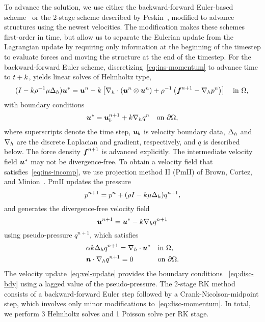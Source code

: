 To advance the solution, we use either the backward-forward Euler-based scheme~%
\cite{Ascher:1997tm} or the 2-stage scheme described by Peskin~\cite{Peskin:2002go},
modified to advance structures using the newest velocities. The modification makes these
schemes first-order in time, but allow us to separate the Eulerian update from the
Lagrangian update by requiring only information at the beginning of the timestep to
evaluate forces and moving the structure at the end of the timestep. For the
backward-forward Euler scheme, discretizing~\eqref{eq:ins-momentum} to advance time to
$t+k$, yields linear solves of Helmholtz type,
\begin{equation}\label{eq:disc-momentum}
    (I - \timestep\rho^{-1}\mu \laplacian_h) \u^\ast = \u^n - \timestep\left[\div[h]\left(\u^n\otimes\u^n\right) + \rho^{-1}\left(\f^{n+1} - \grad[h]p^n\right)\right] \quad\text{in}~\domain, \\
\end{equation}
with boundary conditions
\begin{equation}\label{eq:disc-bdy}
    \u^\ast = \u^{n+1}_b + \timestep \grad[h] q^{n} \quad\text{on}~\partial\domain,
\end{equation}
where superscripts denote the time step, $\boldsymbol{u}_b$ is velocity boundary data, $\Delta_h$
and $\grad[h]$ are the discrete Laplacian and gradient, respectively, and $q$ is
described below. The force density $\boldsymbol{f}^{n+1}$ is advanced explicitly. The intermediate
velocity field $\boldsymbol{u}^\ast$ may not be divergence-free. To obtain a velocity field that
satisfies~\eqref{eq:ins-incomp}, we use projection method II (PmII) of Brown, Cortez, and
Minion~\cite{Brown:2001bq}. PmII updates the pressure
\begin{equation*}
    p^{n+1} = p^n + (\rho I - k\mu\Delta_h)q^{n+1},
\end{equation*}
and generates the divergence-free velocity field
\begin{equation}\label{eq:vel-update}
    \u^{n+1} = \u^\ast - \timestep\grad[h]q^{n+1}
\end{equation}
using pseudo-pressure $q^{n+1}$, which satisfies
\begin{equation}
\begin{alignedat}{2}
    &\alpha k \laplacian_h q^{n+1} = \div[h]\u^\ast &&\quad \text{in}~\domain, \\
    &\n\cdot\grad[h] q^{n+1} = 0                    &&\quad \text{on}~\partial\domain.
\end{alignedat}
\end{equation}
The velocity update~\eqref{eq:vel-update} provides the boundary conditions~%
\eqref{eq:disc-bdy} using a lagged value of the pseudo-pressure. The 2-stage RK method
consists of a backward-forward Euler step followed by a Crank-Nicolson-midpoint step,
which involves only minor modifications to~\eqref{eq:disc-momentum}. In total, we perform
3 Helmholtz solves and 1 Poisson solve per RK stage.

